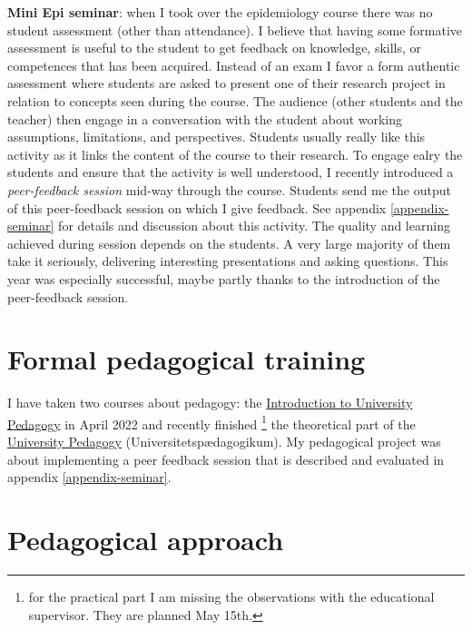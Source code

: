 \documentclass[12pt]{article}
\begin{document}
\bigskip

\textbf{Mini Epi seminar}: when I took over the epidemiology course there was
no student assessment (other than attendance). I believe that having
some formative assessment is useful to the student to get feedback on
knowledge, skills, or competences that has been acquired. Instead of
an exam I favor a form authentic assessment where students are asked
to present one of their research project in relation to concepts seen
during the course. The audience (other students and the teacher) then
engage in a conversation with the student about working assumptions,
limitations, and perspectives. Students usually really like this
activity as it links the content of the course to their
research. \newline To engage ealry the students and ensure that the
activity is well understood, I recently introduced a \emph{peer-feedback
session} mid-way through the course. Students send me the output of
this peer-feedback session on which I give feedback. See appendix
\ref{appendix-seminar} for details and discussion about this
activity. \newline The quality and learning achieved during session
depends on the students. A very large majority of them take it
seriously, delivering interesting presentations and asking
questions. This year was especially successful, maybe partly thanks to
the introduction of the peer-feedback session.


\clearpage


\section{Formal pedagogical training}
\label{sec:orgbd2ed95}

I have taken two courses about pedagogy: the \href{https://absalon.ku.dk/courses/58829}{Introduction to
University Pedagogy} in April 2022 and recently finished \footnote{for the
practical part I am missing the observations with the educational
supervisor. They are planned May 15th.} the theoretical part of the
\href{https://absalon.ku.dk/courses/58114}{University Pedagogy} (Universitetspædagogikum). My pedagogical project
was about implementing a peer feedback session that is described and
evaluated in appendix \ref{appendix-seminar}.

\section{Pedagogical approach}
\label{sec:orgb7481dd}
\end{document}
